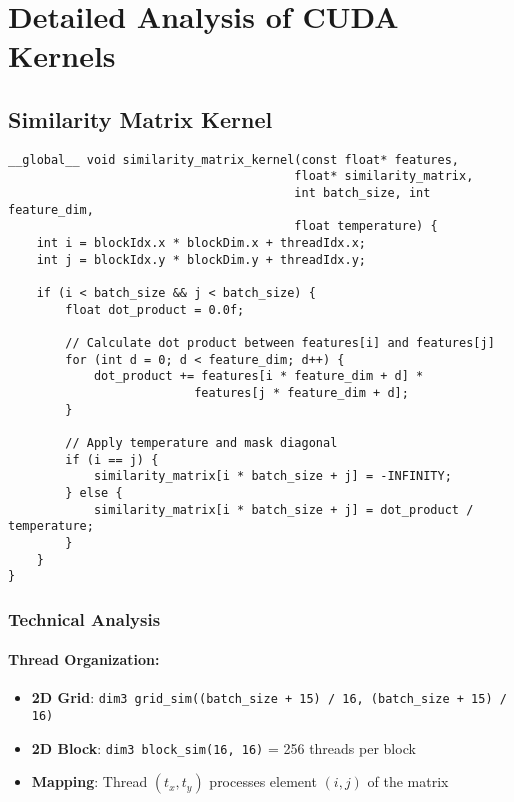 \documentclass[a4paper,11pt]{article}
\begin{document}
\section{Detailed Analysis of CUDA Kernels}

\subsection{Similarity Matrix Kernel}

\begin{lstlisting}[caption={Kernel for similarity matrix calculation}]
__global__ void similarity_matrix_kernel(const float* features, 
                                        float* similarity_matrix, 
                                        int batch_size, int feature_dim, 
                                        float temperature) {
    int i = blockIdx.x * blockDim.x + threadIdx.x;
    int j = blockIdx.y * blockDim.y + threadIdx.y;
    
    if (i < batch_size && j < batch_size) {
        float dot_product = 0.0f;
        
        // Calculate dot product between features[i] and features[j]
        for (int d = 0; d < feature_dim; d++) {
            dot_product += features[i * feature_dim + d] * 
                          features[j * feature_dim + d];
        }
        
        // Apply temperature and mask diagonal
        if (i == j) {
            similarity_matrix[i * batch_size + j] = -INFINITY;
        } else {
            similarity_matrix[i * batch_size + j] = dot_product / temperature;
        }
    }
}
\end{lstlisting}

\subsubsection{Technical Analysis}

\paragraph{Thread Organization:}
\begin{itemize}
    \item \textbf{2D Grid}: \texttt{dim3 grid\_sim((batch\_size + 15) / 16, (batch\_size + 15) / 16)}
    \item \textbf{2D Block}: \texttt{dim3 block\_sim(16, 16)} = 256 threads per block
    \item \textbf{Mapping}: Thread \((t_x, t_y)\) processes element \((i, j)\) of the matrix
\end{itemize}
\end{document}
